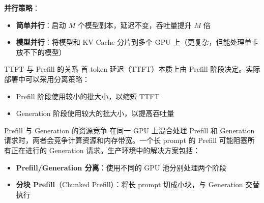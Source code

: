 \textbf{并行策略}：

\begin{itemize}
    \item \textbf{简单并行}：启动 $M$ 个模型副本，延迟不变，吞吐量提升 $M$ 倍
    \item \textbf{模型并行}：将模型和 KV Cache 分片到多个 GPU 上（更复杂，但能处理单卡放不下的模型）
\end{itemize}

\begin{knowledgebox}{TTFT 与 Prefill 的关系}
首 token 延迟（TTFT）本质上由 Prefill 阶段决定。实际部署中可以采用分离策略：
\begin{itemize}
    \item Prefill 阶段使用较小的批大小，以缩短 TTFT
    \item Generation 阶段使用较大的批大小，以提高吞吐量
\end{itemize}
\end{knowledgebox}

\begin{warningbox}{Prefill 与 Generation 的资源竞争}
在同一 GPU 上混合处理 Prefill 和 Generation 请求时，两者会竞争计算资源和内存带宽。一个长 prompt 的 Prefill 可能阻塞所有正在进行的 Generation 请求。生产环境中的解决方案包括：
\begin{itemize}
    \item \textbf{Prefill/Generation 分离}：使用不同的 GPU 池分别处理两个阶段
    \item \textbf{分块 Prefill}（Chunked Prefill）：将长 prompt 切成小块，与 Generation 交替执行
\end{itemize}
\end{warningbox}

